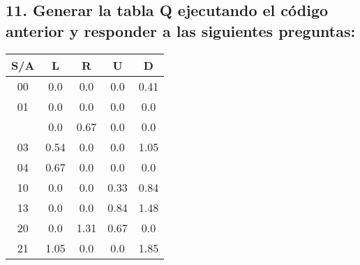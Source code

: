 \documentclass[10pt, spanish, pdftex]{../.template/template}
\begin{document}
\subsection{11. Generar la tabla Q ejecutando el código anterior y responder a las siguientes preguntas:}
\begin{table}[h!]
    \label{tablaqdet}
    \centering
    \begin{tabular}{c|c|c|c|c|}
    \cline{2-5}
    S/A                                             & L                            & R                            & U    & D                            \\ \hline
    \multicolumn{1}{|c|}{00}                        & 0.0                          & 0.0                          & 0.0  & 0.41                         \\ \hline
    \multicolumn{1}{|c|}{01}                        & 0.0                          & 0.0                          & 0.0  & 0.0                          \\ \hline
    \rowcolor[HTML]{9AFF99} 
    \multicolumn{1}{|c|}{\cellcolor[HTML]{9AFF99}I} & 0.0                          & \cellcolor[HTML]{FD6864}0.67 & 0.0  & 0.0                          \\ \hline
    \multicolumn{1}{|c|}{03}                        & 0.54                         & 0.0                          & 0.0  & \cellcolor[HTML]{FD6864}1.05 \\ \hline
    \multicolumn{1}{|c|}{04}                        & 0.67                         & 0.0                          & 0.0  & 0.0                          \\ \hline
    \multicolumn{1}{|c|}{10}                        & 0.0                          & 0.0                          & 0.33 & 0.84                         \\ \hline
    \multicolumn{1}{|c|}{13}                        & 0.0                          & 0.0                          & 0.84 & \cellcolor[HTML]{FD6864}1.48 \\ \hline
    \multicolumn{1}{|c|}{20}                        & 0.0                          & 1.31                         & 0.67 & 0.0                          \\ \hline
    \multicolumn{1}{|c|}{21}                        & 1.05                         & 0.0                          & 0.0  & 1.85                         \\ \hline

\end{tabular}
\end{table}
\end{document}
